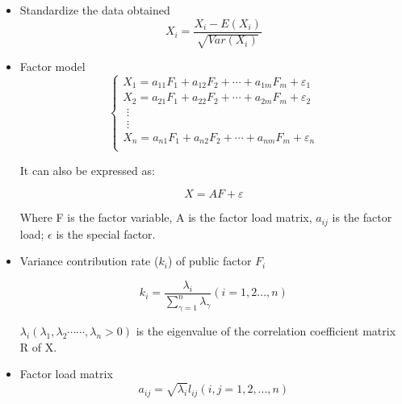\documentclass[12pt]{article}  %
\begin{document}
\begin{itemize}

    \item Standardize the data obtained
    \begin{equation}
    X_i=\frac{X_i-E\left( X_i \right)}{\sqrt{Var\left( X_i \right)}}
\end{equation}


    
    \item Factor model
\begin{equation}
    \begin{cases}
	X_1=a_{11}F_1+a_{12}F_2+\cdots +a_{1m}F_m+\varepsilon _1\\
	X_2=a_{21}F_1+a_{22}F_2+\cdots +a_{2m}F_m+\varepsilon _2\\
	\,\,\vdots\\
	\,\,\vdots\\
	X_n=a_{n1}F_1+a_{n2}F_2+\cdots +a_{nm}F_m+\varepsilon _n\\
    \end{cases}
\end{equation}

It can also be expressed as:

\begin{equation}
    X=AF+\varepsilon 
\end{equation}

Where F is the factor variable, A is the factor load matrix, $a_{ij}$ is the factor load; $\epsilon$ is the special factor.





    \item Variance contribution rate (${k_i}$) of public factor $F_i$
    
    
    \begin{equation}
        k_i=\frac{\lambda _i}{\sum_{\gamma =1}^n{\lambda _{\gamma}}}\left( i=1,2...,n \right) 
    \end{equation}
    
    
$\lambda _i\left( \lambda _1,\lambda _2\cdots \cdots ,\lambda _n>0 \right) $
is the eigenvalue of the correlation coefficient matrix R of X.
    
    \item Factor load matrix
    \begin{equation}
            a_{ij}=\sqrt{\lambda _i}l_{ij}\left( i,j=1,2,...,n \right) 
    \end{equation}
    
    
    

\end{itemize}
\end{document}
